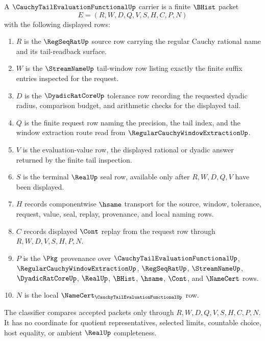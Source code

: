 \begin{definition}
\label{def:cauchy-tail-evaluation-functional-carrier}
A $\CauchyTailEvaluationFunctionalUp$ carrier is a finite $\BHist$ packet
$$
E=(R,W,D,Q,V,S,H,C,P,N)
$$
with the following displayed rows:
\begin{enumerate}
\item $R$ is the $\RegSeqRatUp$ source row carrying the regular Cauchy rational name and its tail-readback surface.
\item $W$ is the $\StreamNameUp$ tail-window row listing exactly the finite suffix entries inspected for the request.
\item $D$ is the $\DyadicRatCoreUp$ tolerance row recording the requested dyadic radius, comparison budget, and arithmetic checks for the displayed tail.
\item $Q$ is the finite request row naming the precision, the tail index, and the window extraction route read from $\RegularCauchyWindowExtractionUp$.
\item $V$ is the evaluation-value row, the displayed rational or dyadic answer returned by the finite tail inspection.
\item $S$ is the terminal $\RealUp$ seal row, available only after $R,W,D,Q,V$ have been displayed.
\item $H$ records componentwise $\hsame$ transport for the source, window, tolerance, request, value, seal, replay, provenance, and local naming rows.
\item $C$ records displayed $\Cont$ replay from the request row through $R,W,D,V,S,H,P,N$.
\item $P$ is the $\Pkg$ provenance over $\CauchyTailEvaluationFunctionalUp$, $\RegularCauchyWindowExtractionUp$, $\RegSeqRatUp$, $\StreamNameUp$, $\DyadicRatCoreUp$, $\RealUp$, $\BHist$, $\hsame$, $\Cont$, and $\NameCert$ rows.
\item $N$ is the local $\NameCert_{\CauchyTailEvaluationFunctionalUp}$ row.
\end{enumerate}
The classifier compares accepted packets only through $R,W,D,Q,V,S,H,C,P,N$. It has no coordinate for quotient representatives, selected limits, countable choice, host equality, or ambient $\RealUp$ completeness.
\end{definition}

